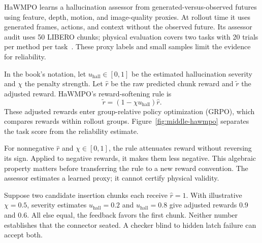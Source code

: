 

HaWMPO learns a hallucination assessor from generated-versus-observed futures using feature, depth, motion, and image-quality proxies. At rollout time it uses generated frames, actions, and context without the observed future. Its assessor audit uses 50 LIBERO chunks; physical evaluation covers two tasks with 20 trials per method per task~\citep[Secs.~3 and 4.3--4.6]{hawmpo}. These proxy labels and small samples limit the evidence for reliability.

In the book's notation, let $u_{\mathrm{hall}}\in[0,1]$ be the estimated hallucination severity and $\chi$ the penalty strength. Let $\widehat r$ be the raw predicted chunk reward and $\widetilde r$ the adjusted reward. HaWMPO's reward-softening rule is
\begin{equation}
 \widetilde r=(1-\chi u_{\mathrm{hall}})\widehat r.
 \label{eq:reward-soft}
\end{equation}
These adjusted rewards enter group-relative policy optimization (GRPO), which compares rewards within rollout groups. Figure~\ref{fig:middle-hawmpo} separates the task score from the reliability estimate.

For nonnegative $\widehat r$ and $\chi\in[0,1]$, the rule attenuates reward without reversing its sign. Applied to negative rewards, it makes them less negative. This algebraic property matters before transferring the rule to a new reward convention. The assessor estimates a learned proxy; it cannot certify physical validity.

Suppose two candidate insertion chunks each receive $\widehat r=1$. With illustrative $\chi=0.5$, severity estimates $u_{\mathrm{hall}}=0.2$ and $u_{\mathrm{hall}}=0.8$ give adjusted rewards $0.9$ and $0.6$. All else equal, the feedback favors the first chunk. Neither number establishes that the connector seated. A checker blind to hidden latch failure can accept both.


